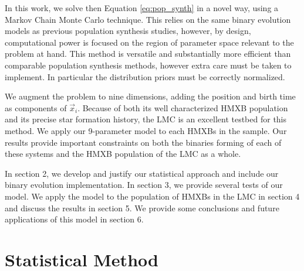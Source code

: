 \documentclass[12pt, preprint]{aastex}
\begin{document}

In this work, we solve then Equation \ref{eq:pop_synth} in a novel way, using a Markov Chain Monte Carlo technique. This relies on the same binary evolution models as previous population synthesis studies, however, by design, computational power is focused on the region of parameter space relevant to the problem at hand. This method is versatile and substantially more efficient than comparable population synthesis methods, however extra care must be taken to implement. In particular the distribution priors must be correctly normalized.

We augment the problem to nine dimensions, adding the position and birth time as components of $\vec{x}_i$. Because of both its well characterized HMXB population and its precise star formation history, the LMC is an excellent testbed for this method. We apply our 9-parameter model to each HMXBs in the sample. Our results provide important constraints on both the binaries forming of each of these systems and the HMXB population of the LMC as a whole.


In section 2, we develop and justify our statistical approach and include our binary evolution implementation. In section 3, we provide several tests of our model. We apply the model to the population of HMXBs in the LMC in section 4 and discuss the results in section 5. We provide some conclusions and future applications of this model in section 6.



\section{Statistical Method}
\end{document}
